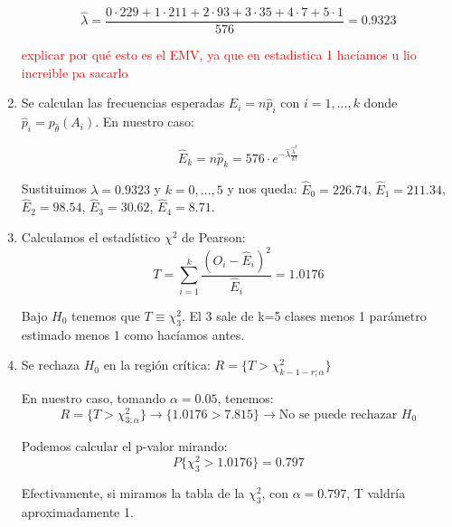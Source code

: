 \documentclass[nochap]{apuntes}
\begin{document}
\begin{example}
\begin{enumerate}
$$ \hat{\lambda} = \frac{0\cdot229 + 1\cdot211+2\cdot93+3\cdot35+4\cdot7+5\cdot1}{576}=0.9323$$

\textcolor{red}{explicar por qué esto es el EMV, ya que en estadistica 1 hacíamos u lio increible pa sacarlo}

\item Se calculan las frecuencias esperadas $\hat{E}_i=n\hat{p}_i$ con $i=1,...,k$ donde $\hat{p}_i = p_{\hat{\theta}}(A_i)$. En nuestro caso:

$$\hat{E}_k = n\hat{p}_k = 576\cdot e^{-\hat{\lambda}\frac{\hat{\lambda}^k}{k!}}$$

Sustituimos $\lambda = 0.9323$ y $k=0,...,5$ y nos queda: $\hat{E}_0 = 226.74 $, $\hat{E}_1 = 211.34 $, $\hat{E}_2 = 98.54$, $\hat{E}_3 = 30.62$, $\hat{E}_4 = 8.71$.

\item Calculamos el estadístico $\chi^2$ de Pearson:
\[
T=\sum_{i=1}^k \frac{(O_i-\hat{E}_i)^2}{\hat{E}_i} = 1.0176
\]

Bajo $H_0$ tenemos que $T \equiv \chi^2_3$. El 3 sale de k=5 clases menos 1 parámetro estimado menos 1 como hacíamos antes.

\item Se rechaza $H_0$ en la región crítica: $R=\{T>\chi^2_{k-1-r;\alpha}  \}$

En nuestro caso, tomando $\alpha = 0.05$, tenemos: $$R=\{T>\chi^2_{3;\alpha} \} \rightarrow \{1.0176>7.815 \} \rightarrow \text{No se puede rechazar } H_0$$

Podemos calcular el p-valor mirando:
$$P\{\chi^2_3 > 1.0176\} = 0.797$$

Efectivamente, si miramos la tabla de la $\chi^2_3$, con $\alpha =0.797$, T valdría aproximadamente 1.
\end{enumerate}

\end{example}
\end{document}
